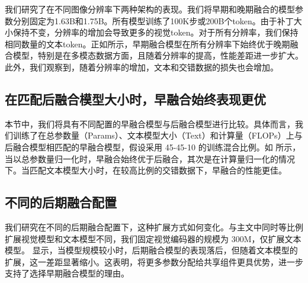 我们研究了在不同图像分辨率下两种架构的表现。我们将早期和晚期融合的模型参数分别固定为1.63B和1.75B。所有模型训练了100K步或200B个token。由于补丁大小保持不变，分辨率的增加会导致更多的视觉token。对于所有分辨率，我们保持相同数量的文本token。正如所示，早期融合模型在所有分辨率下始终优于晚期融合模型，特别是在多模态数据方面，且随着分辨率的提高，性能差距进一步扩大。此外，我们观察到，随着分辨率的增加，文本和交错数据的损失也会增加。

\vspace{1cm}
\subsection{在匹配后融合模型大小时，早融合始终表现更优}


本节中，我们将具有不同配置的早融合模型与后融合模型进行比较。具体而言，我们训练了在总参数量（Params）、文本模型大小（Text）和计算量（FLOPs）上与后融合模型相匹配的早融合模型，假设采用 45-45-10 的训练混合比例。如  所示，当以总参数量归一化时，早融合始终优于后融合，其次是在计算量归一化的情况下。当匹配文本模型大小时，在较高比例的交错数据下，早融合的性能更佳。
\subsection{不同的后期融合配置}
我们研究在不同的后期融合配置下，这种扩展方式如何变化。与主文中同时等比例扩展视觉模型和文本模型不同，我们固定视觉编码器的规模为 300M，仅扩展文本模型。  显示，当模型规模较小时，后期融合模型的表现落后，但随着文本模型的扩展，这一差距显著缩小。这表明，将更多参数分配给共享组件更具优势，进一步支持了选择早期融合模型的理由。

